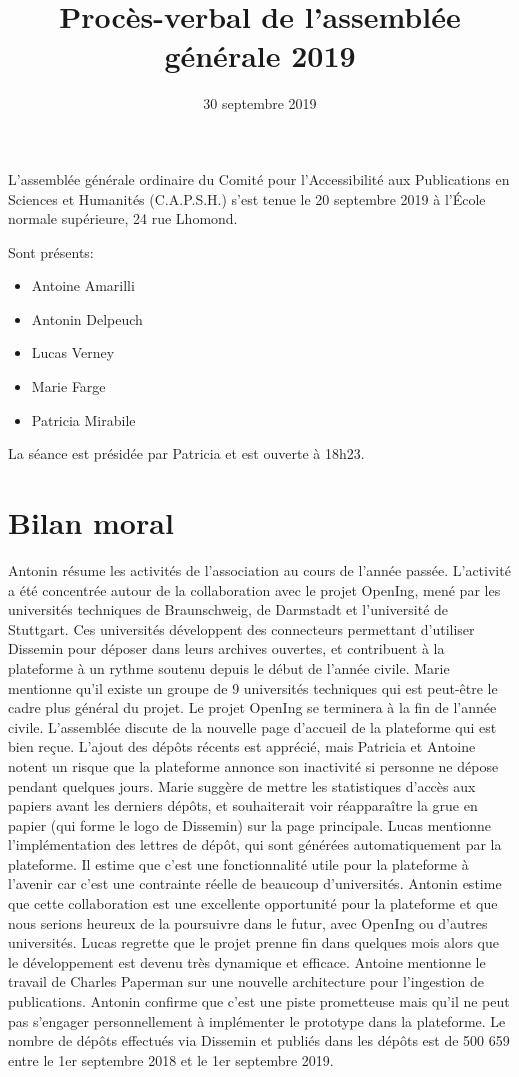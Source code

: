 \documentclass[a4paper]{article}
\title{Procès-verbal de l'assemblée générale 2019}
\date{30 septembre 2019}
\begin{document}
\maketitle

L'assemblée générale ordinaire du Comité pour l'Accessibilité aux Publications en Sciences et Humanités (C.A.P.S.H.) s'est tenue le 20 septembre 2019 à l'École normale supérieure, 24 rue Lhomond.

Sont présents:
\begin{itemize}
  \item Antoine Amarilli
  \item Antonin Delpeuch
  \item Lucas Verney
  \item Marie Farge
  \item Patricia Mirabile
\end{itemize}

La séance est présidée par Patricia et est ouverte à 18h23.

\section{Bilan moral}

Antonin résume les activités de l'association au cours de l'année passée.
L'activité a été concentrée autour de la collaboration avec le projet OpenIng, mené
par les universités techniques de Braunschweig, de Darmstadt et l'université de 
Stuttgart. Ces universités développent des connecteurs permettant d'utiliser
Dissemin pour déposer dans leurs archives ouvertes, et contribuent à la plateforme
à un rythme soutenu depuis le début de l'année civile.
Marie mentionne qu'il existe un groupe de 9 universités techniques qui est peut-être
le cadre plus général du projet.
Le projet OpenIng se terminera à la fin de l'année civile.
L'assemblée discute de la nouvelle page d'accueil de la plateforme qui est bien reçue.
L'ajout des dépôts récents est apprécié, mais Patricia et Antoine notent un risque 
que la plateforme annonce son inactivité si personne ne dépose pendant quelques jours.
Marie suggère de mettre les statistiques d'accès aux papiers avant les derniers dépôts, et
souhaiterait voir réapparaître la grue en papier (qui forme le logo de Dissemin) sur 
la page principale.
Lucas mentionne l'implémentation des lettres de dépôt, qui sont générées automatiquement
 par la plateforme. Il estime que c'est une fonctionnalité utile pour la plateforme à l'avenir car c'est une contrainte réelle de beaucoup d'universités.
Antonin estime que cette collaboration est une excellente opportunité pour la plateforme
et que nous serions heureux de la poursuivre dans le futur, avec OpenIng ou d'autres universités. Lucas regrette que le projet prenne fin dans quelques mois alors que le développement est devenu très dynamique et efficace.
Antoine mentionne le travail de Charles Paperman sur une nouvelle architecture pour l'ingestion de publications. Antonin confirme que c'est une piste prometteuse mais qu'il ne peut pas s'engager personnellement à implémenter le prototype dans la
plateforme.
Le nombre de dépôts effectués via Dissemin et publiés dans les dépôts est
de 500 659 entre le 1er septembre 2018 et le 1er septembre 2019.
\end{document}
